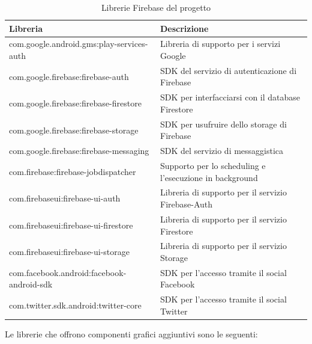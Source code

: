 \begin{table}[!h]
\begin{center}
\begin{tabular}{|p{6cm}|p{7cm}|}
    \hline
\textbf{Libreria} & \textbf{Descrizione}\\ \hline
com.google.android.gms:play-services-auth  & Libreria di supporto per i servizi Google  \\ \hline
com.google.firebase:firebase-auth & SDK del servizio di autenticazione di Firebase \\ \hline
com.google.firebase:firebase-firestore & SDK per interfacciarsi con il database Firestore \\ \hline
com.google.firebase:firebase-storage & SDK per usufruire dello storage di Firebase  \\ \hline
com.google.firebase:firebase-messaging & SDK del servizio di messaggistica \\ \hline
com.firebase:firebase-jobdispatcher  & Supporto per lo scheduling e l'esecuzione in background\\ \hline
com.firebaseui:firebase-ui-auth & Libreria di supporto per il servizio Firebase-Auth  \\ \hline
com.firebaseui:firebase-ui-firestore & Libreria di supporto per il servizio Firestore  \\ \hline
com.firebaseui:firebase-ui-storage & Libreria di supporto per il servizio Storage  \\ \hline
com.facebook.android:facebook-android-sdk & SDK per l'accesso tramite il social Facebook \\ \hline
com.twitter.sdk.android:twitter-core & SDK per l'accesso tramite il social Twitter \\ \hline
\end{tabular}
\caption[Librerie Firebase del progetto]{Librerie Firebase del progetto}\label{tab:Librerie Firebase del progetto}
\end{center}
\end{table}

\newpage



Le librerie che offrono componenti grafici aggiuntivi sono le seguenti:

